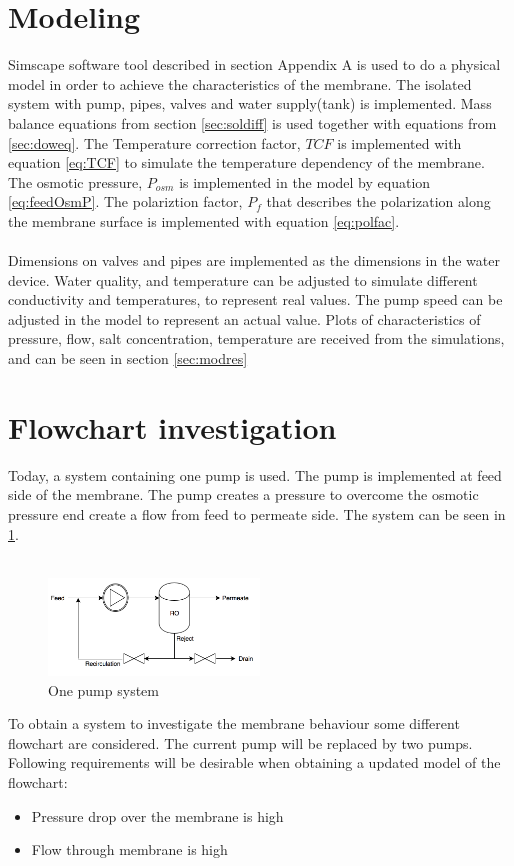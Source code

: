 \section{Modeling}
Simscape software tool described in section Appendix A is used to do a physical model in order to achieve the characteristics of the membrane. The isolated system with pump, pipes, valves and water supply(tank) is implemented. Mass balance equations from section \ref{sec:soldiff} is used together with equations from \ref{sec:doweq}. The Temperature correction factor, $TCF$ is implemented with equation \ref{eq:TCF} to simulate the temperature dependency of the membrane. The osmotic pressure, $P_{osm}$ is implemented in the model by equation \ref{eq:feedOsmP}. The polariztion factor, $P_{f}$ that describes the polarization along the membrane surface is implemented with equation \ref{eq:polfac}. 
\\
\\
Dimensions on valves and pipes are implemented as the dimensions in the water device. Water quality, and temperature can be adjusted to simulate different conductivity and temperatures, to represent real values. The pump speed can be adjusted in the model to represent an actual value. Plots of characteristics of pressure, flow, salt concentration, temperature are received from the simulations, and can be seen in section \ref{sec:modres}

\section{Flowchart investigation}
\label{Flowchart}
Today, a system containing one pump is used. The pump is implemented at feed side of the membrane. The pump creates a pressure to overcome the osmotic pressure end create a flow from feed to permeate side. The system can be seen in \ref{fig:System11}. \\
\\
\begin{figure}[h]
    \centering
    \includegraphics[width=0.5\textwidth]{Sys1}
    \caption{One pump system}
    \label{fig:System11}
\end{figure}
To obtain a system to investigate the membrane behaviour some different flowchart are considered. The current pump will be replaced by two pumps. Following requirements will be desirable when obtaining a updated model of the flowchart:
\begin{itemize}
\renewcommand\labelitemi{ }
\item Pressure drop over the membrane is high
\item Flow through membrane is high
\end{itemize}

